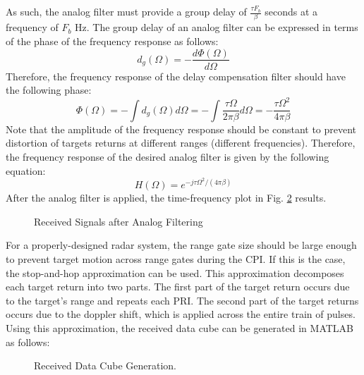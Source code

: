 \documentclass[conference]{IEEEtran}
\begin{document}
As such, the analog filter must provide a group delay of $\frac{\tau F_b}{\beta}$ seconds at a frequency of $F_b$ Hz. The group delay of an analog filter can be expressed in terms of the phase of the frequency response as follows:
\begin{equation}
d_g(\Omega) = -\frac{d\Phi(\Omega)}{d\Omega}
\end{equation}
Therefore, the frequency response of the delay compensation filter should have the following phase:
\begin{equation}
\Phi(\Omega) = -\int d_g(\Omega)d\Omega = -\int\frac{\tau\Omega}{2\pi\beta}d\Omega = -\frac{\tau\Omega^2}{4\pi\beta}
\end{equation}
Note that the amplitude of the frequency response should be constant to prevent distortion of targets returns at different ranges (different frequencies). Therefore, the frequency response of the desired analog filter is given by the following equation:
\begin{equation}
H(\Omega) = e^{-j\tau\Omega^2/(4\pi\beta)}
\end{equation} 
After the analog filter is applied, the time-frequency plot in Fig. \ref{beat_freq_analog_filt} results.
\begin{figure}[H]
\centerline{}
\caption{Received Signals after Analog Filtering}
\label{beat_freq_analog_filt}
\end{figure}
For a properly-designed radar system, the range gate size should be large enough to prevent target motion across range gates during the CPI. If this is the case, the stop-and-hop approximation can be used. This approximation decomposes each target return into two parts. The first part of the target return occurs due to the target's range and repeats each PRI. The second part of the target returns occurs due to the doppler shift, which is applied across the entire train of pulses. Using this approximation, the received data cube can be generated in MATLAB as follows:
\begin{figure}[H]
\centerline{}
\caption{Received Data Cube Generation.}
\label{beat_freq_analog_filt}
\end{figure}
\end{document}
